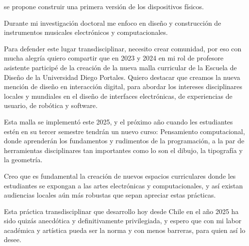 \documentclass{article}
\begin{document}
se propone construir una primera versión de los dispositivos físicos.

Durante mi investigación doctoral me enfoco en diseño y construcción de instrumentos musicales electrónicos y computacionales.

Para defender este lugar transdisciplinar, necesito crear comunidad, por eso con mucha alegría quiero compartir que en 2023 y 2024 en mi rol de profesore asistente participé de la creación de la nueva malla curricular de la Escuela de Diseño de la Universidad Diego Portales. Quiero destacar que creamos la nueva mención de diseño en interacción digital, para abordar los intereses disciplinares locales y mundiales en el diseño de interfaces electrónicas, de experiencias de usuario, de robótica y software.

Esta malla se implementó este 2025, y el próximo año cuando les estudiantes estén en su tercer semestre tendrán un nuevo curso: Pensamiento computacional, donde aprenderán los fundamentos y rudimentos de la programación, a la par de herramientas disciplinares tan importantes como lo son el dibujo, la tipografía y la geometría.

Creo que es fundamental la creación de nuevos espacios curriculares donde les estudiantes se expongan a las artes electrónicas y computacionales, y así existan audiencias locales aún más robustas que sepan apreciar estas prácticas.

Esta práctica transdisciplinar que desarrollo hoy desde Chile en el año 2025 ha sido quizás anecdótica y definitivamente privilegiada, y espero que con mi labor académica y artística pueda ser la norma y con menos barreras, para quien así lo desee.

\clearpage

\printbibliography[title={Bibliografía}, heading=bibintoc]
\end{document}

